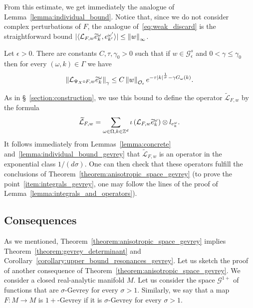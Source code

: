 \documentclass[AHL,Unicode,longabstracts,published]{cedram}
\newcommand{\n}[1]{\left\|#1\right\|}
\newcommand{\va}[1]{\left|#1\right|}
\newcommand{\brac}[1]{\langle #1 \rangle}
\newcommand{\clO}{\mathcal{O}}
\newcommand{\clL}{\mathcal{L}}
\newcommand{\clG}{\mathcal{G}}
\newcommand{\bbZ}{\mathbb{Z}}
\let\oldtilde\tilde
\renewcommand*{\tilde}[1]{\mathchoice{\widetilde{#1}}{\widetilde{#1}}{\oldtilde{#1}}{\oldtilde{#1}}}
\newcommand{\clO}{\mathcal{O}}
\begin{document}
From this estimate, we get immediately the analogue of Lemma~\ref{lemma:individual_bound}. Notice that, since we do not consider complex perturbations of $F$, the analogue of~\eqref{eq:weak_discard} is the straightforward bound $|\brac{\clL_{F,w} \tilde{e}_{k}^\omega, e_{k'}^{\omega'}}| \leq \n{w}_\infty$.

\begin{lemm}\label{lemma:individual_bound_gevrey}
Let $\epsilon > 0$. There are constants $C,\tau,\gamma_0 > 0$ such that if $w \in \clG_\epsilon^s$ and $0 < \gamma \leq \gamma_0$ then for every $(\omega,k) \in \Gamma$ we have
\begin{equation*}
\n{\clL_{\Psi_X \circ F,w} \tilde{e}_{k}^\omega}_\gamma \leq C \n{w}_{\clO_\epsilon} e^{- \tau \va{k}^{\frac{1}{\sigma}} - \gamma G_\omega(k)}.
\end{equation*}
\end{lemm}

As in \S~\ref{section:construction}, we use this bound to define the operator $\widetilde{\clL}_{F,w}$ by the formula
\begin{equation}\label{eq:def_L_tilde_gevrey}
\widetilde{\clL}_{F,w} = \sum_{\omega \in \Omega, k \in \bbZ^d} \iota\left(\clL_{F,w} \tilde{e}_{k}^\omega\right) \otimes l_{e_k^\omega}.
\end{equation}
It follows immediately from Lemmas~\ref{lemma:concrete} and~\ref{lemma:individual_bound_gevrey} that $\widetilde{\clL}_{F,w}$ is an operator in the exponential class $1/(d \sigma)$. One can then check that these operators fulfill the conclusions of Theorem~\ref{theorem:anisotropic_space_gevrey} (to prove the point~\ref{item:integrals_gevrey}, one may follow the lines of the proof of Lemma~\ref{lemma:integrals_and_operators}).

\subsection{Consequences}

As we mentioned, Theorem~\ref{theorem:anisotropic_space_gevrey} implies Theorem~\ref{theorem:gevrey_determinant} and Corollary~\ref{corollary:upper_bound_resonances_gevrey}. Let us sketch the proof of another consequence of Theorem~\ref{theorem:anisotropic_space_gevrey}. We consider a closed real-analytic manifold $M$. Let us consider the space $\clG^{1+}$ of functions that are $\sigma$-Gevrey for every $\sigma >1$. Similarly, we say that a map $F: M \to M$ is $1+$-Gevrey if it is $\sigma$-Gevrey for every $\sigma > 1$.
\end{document}
